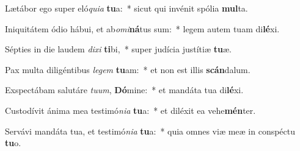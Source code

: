 \item Lætábor ego super eló\textit{qui}\textit{a} \textbf{tu}a:~* sicut qui invénit spólia \textbf{mul}ta.
\item Iniquitátem ódio hábui, et ab\textit{o}\textit{mi}\textbf{ná}tus sum:~* legem autem tuam di\textbf{lé}xi.
\item Sépties in die laudem \textit{di}\textit{xi} \textbf{ti}bi,~* super judícia justítiæ \textbf{tu}æ.
\item Pax multa diligéntibus \textit{le}\textit{gem} \textbf{tu}am:~* et non est illis \textbf{scán}dalum.
\item Exspectábam salutáre \textit{tu}\textit{um}, \textbf{Dó}mine:~* et mandáta tua di\textbf{lé}xi.
\item Custodívit ánima mea testimó\textit{ni}\textit{a} \textbf{tu}a:~* et diléxit ea vehe\textbf{mén}ter.
\item Servávi mandáta tua, et testimó\textit{ni}\textit{a} \textbf{tu}a:~* quia omnes viæ meæ in conspéctu \textbf{tu}o.
